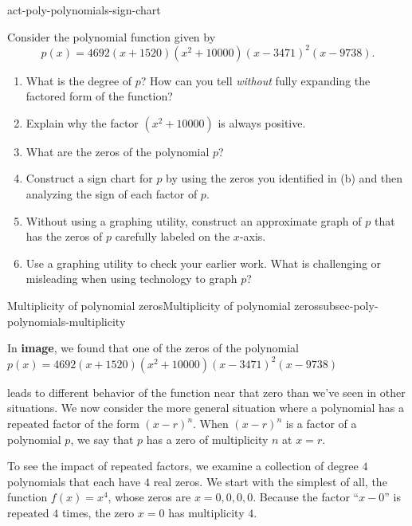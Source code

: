 \documentclass{ximera}
\begin{document}
\begin{exploration}{}{act-poly-polynomials-sign-chart}%

Consider the polynomial function given by%
$$
p(x) = 4692(x+1520)(x^2+10000)(x-3471)^2(x-9738)\text{.}
$$
%

\begin{enumerate}[label=\alph*.]
\item What is the degree of $p$?  How can you tell \emph{without} fully expanding the factored form of the function?%
\item Explain why the factor $(x^2 + 10000)$ is always positive.%
\item What are the zeros of the polynomial $p$?%
\item Construct a sign chart for $p$ by using the zeros you identified in (b) and then analyzing the sign of each factor of $p$.%
\item Without using a graphing utility, construct an approximate graph of $p$ that has the zeros of $p$ carefully labeled on the $x$-axis.%
\item Use a graphing utility to check your earlier work.  What is challenging or misleading when using technology to graph $p$?%
\end{enumerate}
%
\end{exploration}

%
%
%
{Multiplicity of polynomial zeros}{}{Multiplicity of polynomial zeros}{}{}{subsec-poly-polynomials-multiplicity}

In \textbf{image}, we found that one of the zeros of the polynomial $p(x)=4692(x + 1520)(x^{2} + 10000)(x - 3471)^{2}(x - 9738)$

 leads to different behavior of the function near that zero than we've seen in other situations.  We now consider the more general situation where a polynomial has a repeated factor of the form $(x-r)^{n}$.  When $(x-r)^{n}$ is a factor of a polynomial $p$, we say that $p$ has a zero of multiplicity $n$ at $x=r$. 

To see the impact of repeated factors, we examine a collection of degree $4$ polynomials that each have $4$ real zeros.  We start with the simplest of all, the function $f(x) = x^4$, whose zeros are $x = 0, 0, 0, 0$.  Because the factor ``$x-0$'' is repeated $4$ times, the zero $x = 0$ has multiplicity $4$.%
\end{document}

